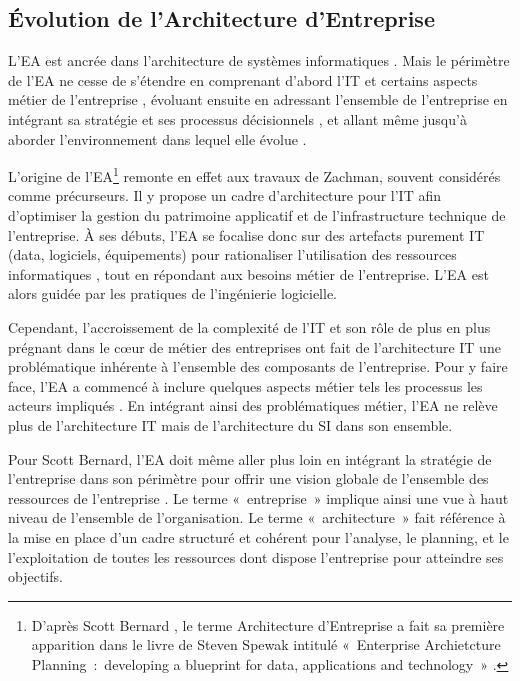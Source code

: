 	\subsection{Évolution de l'Architecture d'Entreprise}

L'EA est ancrée dans l'architecture de systèmes informatiques 
\cite{kappelman2008enterprise}. Mais le périmètre de l'EA ne cesse de s'étendre 
en comprenant d'abord l'IT et certains aspects métier de l'entreprise 
\cite{winter2006essential}, évoluant ensuite en adressant l'ensemble de 
l'entreprise en intégrant sa stratégie et ses processus décisionnels 
\cite{ross2006enterprise}, et allant même jusqu'à aborder l'environnement dans 
lequel elle évolue \cite{lapalme2012three}.

L'origine de l'EA\footnote{D'après Scott Bernard \cite{bernard2012introduction}, 
le terme Architecture d'Entreprise a fait sa première apparition dans le livre 
de Steven Spewak intitulé «~Enterprise Archietcture Planning~:~developing a 
blueprint for data, applications and technology~» \cite{spewak1993enterprise}.}
remonte en effet aux travaux de Zachman, souvent considérés comme précurseurs. 
Il y propose un cadre d'architecture pour l'IT \cite{zachman1987framework} 
afin d'optimiser la gestion du patrimoine applicatif et de l'infrastructure 
technique de l'entreprise. À ses débuts, l'EA 
se focalise donc sur des artefacts purement IT (data, logiciels, équipements) 
pour 
rationaliser l'utilisation des ressources informatiques 
\cite{winter2006essential}, tout en répondant aux besoins métier de 
l'entreprise. L'EA est alors guidée par les pratiques de l'ingénierie 
logicielle. 

Cependant, l'accroissement de la complexité de l'IT et son rôle de plus en plus 
prégnant dans le cœur de métier des entreprises \cite{ranganathan2005enterprise} 
ont fait de l'architecture IT une problématique inhérente à l'ensemble des 
composants de l'entreprise. Pour y faire face, l'EA a commencé à inclure 
quelques aspects métier tels les processus les acteurs impliqués 
\cite{winter2006essential}. En intégrant ainsi des problématiques métier, l'EA 
ne relève plus de l'architecture IT mais de l'architecture du SI dans son 
ensemble.

Pour Scott Bernard, l'EA doit même aller plus loin en intégrant la stratégie de 
l'entreprise dans son périmètre pour offrir une 
vision globale de l'ensemble des ressources de l'entreprise 
\cite{bernard2012introduction}. Le terme 
«~entreprise~» implique ainsi une vue à haut niveau de l'ensemble de 
l'organisation. Le terme «~architecture~» fait référence à la mise en place 
d'un cadre structuré et cohérent pour l'analyse, le planning, et le 
l'exploitation de toutes les ressources dont dispose l'entreprise pour 
atteindre ses objectifs. 

